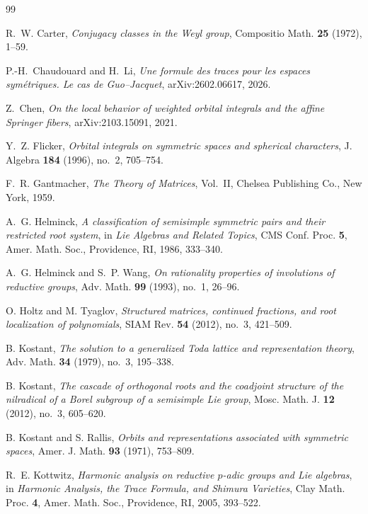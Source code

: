 \documentclass[11pt]{amsart}
\theoremstyle{definition}
\theoremstyle{remark}
\begin{document}
\begin{thebibliography}{99}

R.~W. Carter,
\emph{Conjugacy classes in the Weyl group},
Compositio Math. \textbf{25} (1972), 1--59.

P.-H.~Chaudouard and H.~Li,
\emph{Une formule des traces pour les espaces sym\'etriques. Le cas de
Guo--Jacquet}, arXiv:2602.06617, 2026.

Z.~Chen,
\emph{On the local behavior of weighted orbital integrals and the affine
Springer fibers}, arXiv:2103.15091, 2021.

Y.~Z. Flicker,
\emph{Orbital integrals on symmetric spaces and spherical characters},
J. Algebra \textbf{184} (1996), no.~2, 705--754.

F.~R. Gantmacher,
\emph{The Theory of Matrices}, Vol.~II,
Chelsea Publishing Co., New York, 1959.

A.~G. Helminck,
\emph{A classification of semisimple symmetric pairs and their restricted root
system},
in \emph{Lie Algebras and Related Topics}, CMS Conf. Proc. \textbf{5},
Amer. Math. Soc., Providence, RI, 1986, 333--340.

A.~G. Helminck and S.~P. Wang,
\emph{On rationality properties of involutions of reductive groups},
Adv. Math. \textbf{99} (1993), no.~1, 26--96.

O. Holtz and M. Tyaglov,
\emph{Structured matrices, continued fractions, and root localization of
polynomials},
SIAM Rev. \textbf{54} (2012), no.~3, 421--509.

B. Kostant,
\emph{The solution to a generalized Toda lattice and representation theory},
Adv. Math. \textbf{34} (1979), no.~3, 195--338.

B. Kostant,
\emph{The cascade of orthogonal roots and the coadjoint structure of the
nilradical of a Borel subgroup of a semisimple Lie group},
Mosc. Math. J. \textbf{12} (2012), no.~3, 605--620.

B. Kostant and S. Rallis,
\emph{Orbits and representations associated with symmetric spaces},
Amer. J. Math. \textbf{93} (1971), 753--809.

R.~E. Kottwitz,
\emph{Harmonic analysis on reductive $p$-adic groups and Lie algebras},
in \emph{Harmonic Analysis, the Trace Formula, and Shimura Varieties},
Clay Math. Proc. \textbf{4}, Amer. Math. Soc., Providence, RI, 2005,
393--522.


\end{thebibliography}
\end{document}
